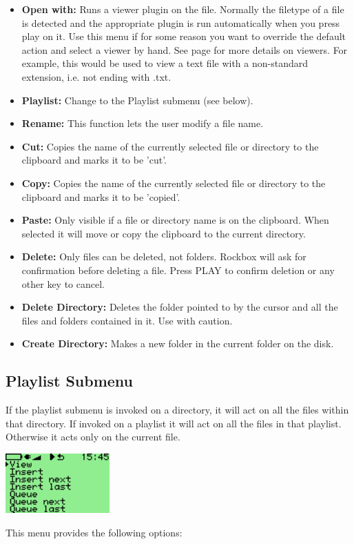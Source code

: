 \begin{itemize}
\item \textbf{Open with:} Runs a viewer plugin on the file. Normally the filetype of a file is detected and the appropriate plugin is run automatically when you press play on it.  Use this menu if for some reason you want to override the default action and select a viewer by hand.  See page \textmd{\pageref{ref:Viewersplugins}} for more details on viewers. For example, this would be used to view a text file with a non-standard extension, i.e. not ending with .txt.
\item \textbf{Playlist:} Change to the Playlist submenu (see below).
\item \textbf{Rename:} This function lets the user modify a file name.
\item \textbf{Cut:} Copies the name of the currently selected file or directory to the clipboard and marks it to be 'cut'.
\item \textbf{Copy:} Copies the name of the currently selected file or directory to the clipboard and marks it to be 'copied'.
\item \textbf{Paste:} Only visible if a file or directory name is on the clipboard. When selected it will move or copy the clipboard to the current directory. 
\item \textbf{Delete:} Only files can be deleted, not folders. Rockbox will ask for confirmation before deleting a file. Press PLAY to confirm deletion or any other key to cancel.
\item \textbf{Delete Directory:} Deletes the folder pointed to by the cursor and all the files and folders contained in it.  Use with caution.
\item \textbf{Create Directory:} Makes a new folder in the current folder on the disk.
\end{itemize}

\subsection{\label{ref:Playlistsubmenu}Playlist Submenu}
If the playlist submenu is invoked on a directory, it will act on all the files within that directory.  If invoked on a playlist it will act on all the files in that playlist. Otherwise it acts only on the current file.
\begin{center}
  \includegraphics[width=4cm]{rockbox_interface/images/ss-playlist-menu-112x64x1.png}
\end{center}
This menu provides the following options:

